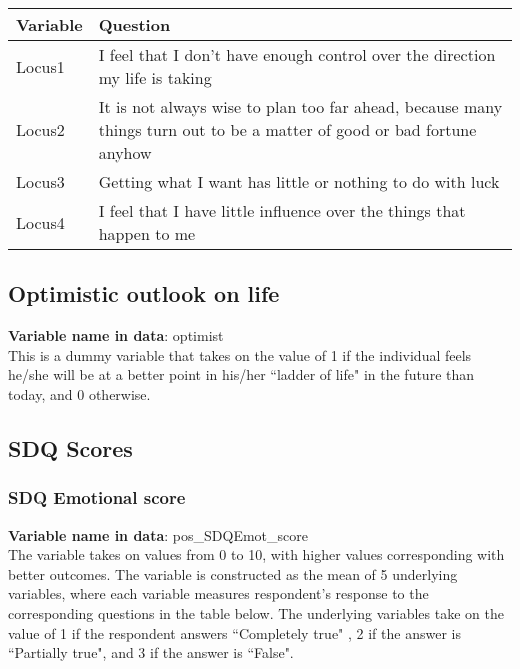 \begin{table}[H]
\setlength{\tabcolsep}{20pt}
\begin{center}

\footnotesize{
	\begin{tabular}{l L{10cm}}
	\hline
	\textbf{Variable} & \textbf{Question} \\
	\hline
	
	Locus1		& I feel that I don’t have enough control over the direction my life is taking \\	
	Locus2		& It is not always wise to plan too far ahead, because many things turn out to be a matter of good or bad fortune anyhow\\
	Locus3		& Getting what I want has little or nothing to do with luck \\
	Locus4		& I feel that I have little influence over the things that happen to me \\
	
	\hline
	
	\end{tabular}
}

\end{center}
\end{table}

\subsection{Optimistic outlook on life}
\textbf{Variable name in data}: optimist \\[.3cm]
This is a dummy variable that takes on the value of 1 if the individual feels he/she will be at a better point in his/her ``ladder of life" in the future than today, and 0 otherwise. 

\subsection{SDQ Scores}
\subsubsection{SDQ Emotional score}
\textbf{Variable name in data}: pos\_SDQEmot\_score \\[.3cm]
The variable takes on values from 0 to 10, with higher values corresponding with better outcomes. The variable is constructed as the mean of 5 underlying variables, where each variable measures respondent's response to the corresponding questions in the table below. The underlying variables take on the value of 1 if the respondent answers  ``Completely true" , 2 if the answer is ``Partially true", and 3 if the answer is ``False".

